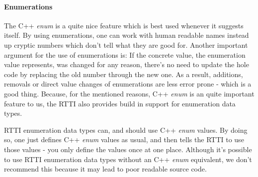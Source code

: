 \paragraph{Enumerations}
The C++ \emph{enum} is a quite nice feature which is best used whenever it suggests itself. By using enumerations, one can work with human readable names instead up cryptic numbers which don't tell what they are good for. Another important argument for the use of enumerations is: If the concrete value, the enumeration value represents, was changed for any reason, there's no need to update the hole code by replacing the old number through the new one. As a result, additions, removals or direct value changes of enumerations are less error prone - which is a good thing. Because, for the mentioned reasons, C++ \emph{enum} is an quite important feature to us, the \ac{RTTI} also provides build in support for enumeration data types.

\ac{RTTI} enumeration data types can, and should use C++ \emph{enum} values. By doing so, one just defines C++ \emph{enum} values as usual, and then tells the \ac{RTTI} to use those values - you only define the values once at one place. Although it's possible to use \ac{RTTI} enumeration data types without an C++ \emph{enum} equivalent, we don't recommend this because it may lead to poor readable source code.

